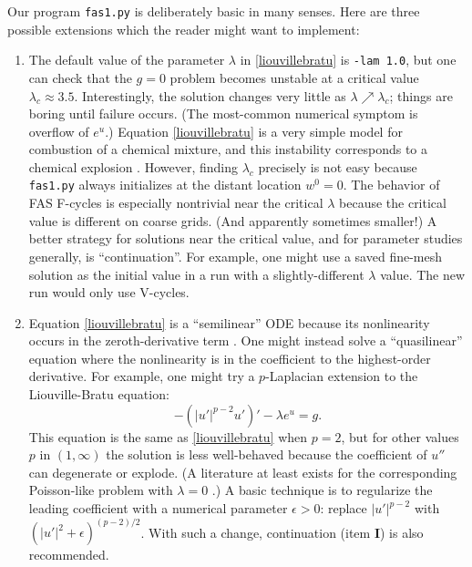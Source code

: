 \documentclass[letterpaper,final,12pt,reqno]{amsart}
\newcommand{\eps}{\epsilon}
\begin{document}
Our program \texttt{fas1.py} is deliberately basic in many senses.  Here are three possible extensions which the reader might want to implement:
\renewcommand{\labelenumi}{\textbf{\Roman{enumi}.}}
\begin{enumerate}
\item The default value of the parameter $\lambda$ in \eqref{liouvillebratu} is \texttt{-lam 1.0}, but one can check that the $g=0$ problem becomes unstable at a critical value $\lambda_c \approx 3.5$.  Interestingly, the solution changes very little as $\lambda \nearrow \lambda_c$; things are boring until failure occurs.  (The most-common numerical symptom is overflow of $e^u$.)  Equation \eqref{liouvillebratu} is a very simple model for combustion of a chemical mixture, and this instability corresponds to a chemical explosion \cite{FrankKameneckij1955}.  However, finding $\lambda_c$ precisely is not easy because \texttt{fas1.py} always initializes at the distant location $w^0=0$.  The behavior of FAS F-cycles is especially nontrivial near the critical $\lambda$ because the critical value is different on coarse grids.  (And apparently sometimes smaller!)  A better strategy for solutions near the critical value, and for parameter studies generally, is ``continuation''.  For example, one might use a saved fine-mesh solution as the initial value in a run with a slightly-different $\lambda$ value.  The new run would only use V-cycles.
\item Equation \eqref{liouvillebratu} is a ``semilinear'' ODE because its nonlinearity occurs in the zeroth-derivative term \cite{Evans2010}.  One might instead solve a ``quasilinear'' equation where the nonlinearity is in the coefficient to the highest-order derivative.  For example, one might try a $p$-Laplacian \cite{Evans2010} extension to the Liouville-Bratu equation:
\begin{equation}
  -\left(|u'|^{p-2} u'\right)' - \lambda e^u = g.  \label{pbratu}
\end{equation}
This equation is the same as \eqref{liouvillebratu} when $p=2$, but for other values $p$ in $(1,\infty)$ the solution is less well-behaved because the coefficient of $u''$ can degenerate or explode.  (A literature at least exists for the corresponding Poisson-like problem with $\lambda=0$ \cite{BarrettLiu1993,Bueler2021}.)  A basic technique is to regularize the leading coefficient with a numerical parameter $\eps>0$: replace $|u'|^{p-2}$ with $\left(|u'|^2+\eps\right)^{(p-2)/2}$.  With such a change, continuation (item \textbf{I}) is also recommended.

\end{enumerate}
\end{document}
